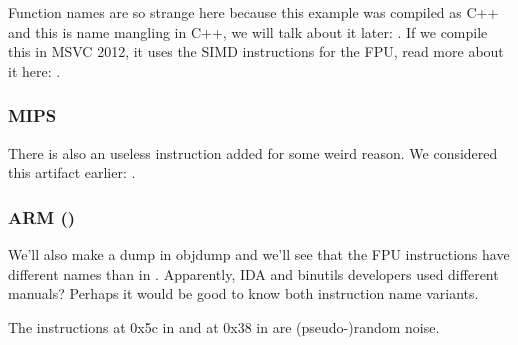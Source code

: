 

Function names are so strange here because this example was compiled as C++ and this is name mangling in C++,
we will talk about it later: .
If we compile this in MSVC 2012, it uses the SIMD instructions for the FPU, read more about it here: .

\subsubsection{MIPS}



There is also an useless  instruction added for some weird reason.
We considered this artifact earlier: .

\subsubsection{ARM (\ARMMode)}




We'll also make a dump in objdump and we'll see that the FPU instructions have different names than in \IDA.
Apparently, IDA and binutils developers used different manuals?
Perhaps it would be good to know both instruction name variants.



The instructions at 0x5c in  and at 0x38 in \main are (pseudo-)random noise.

